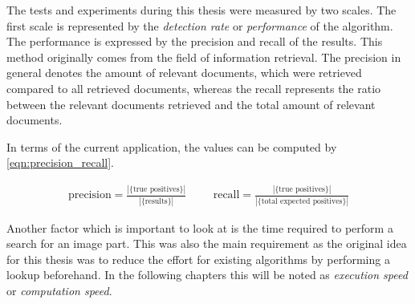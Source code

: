 The tests and experiments during this thesis were measured by two scales. The first scale is represented by the \textit{detection rate} or \textit{performance} of the algorithm. The performance is expressed by the precision and recall of the results. This method originally comes from the field of information retrieval. The precision in general denotes the amount of relevant documents, which were retrieved compared to all retrieved documents, whereas the recall represents the ratio between the relevant documents retrieved and the total amount of relevant documents.

In terms of the current application, the values can be computed by \ref{eqn:precision_recall}.

\begin{align}
 \text{precision}=\frac{|\{\text{true positives}\}|}{|\{\text{results}\}|} &&&
 \text{recall}=\frac{|\{\text{true positives}\}|}{|\{\text{total expected positives}\}|} 
 \label{eqn:precision_recall}
\end{align}

Another factor which is important to look at is the time required to perform a search for an image part. This was also the main requirement as the original idea for this thesis was to reduce the effort for existing algorithms by performing a lookup beforehand. In the following chapters this will be noted as \textit{execution speed} or \textit{computation speed}.
